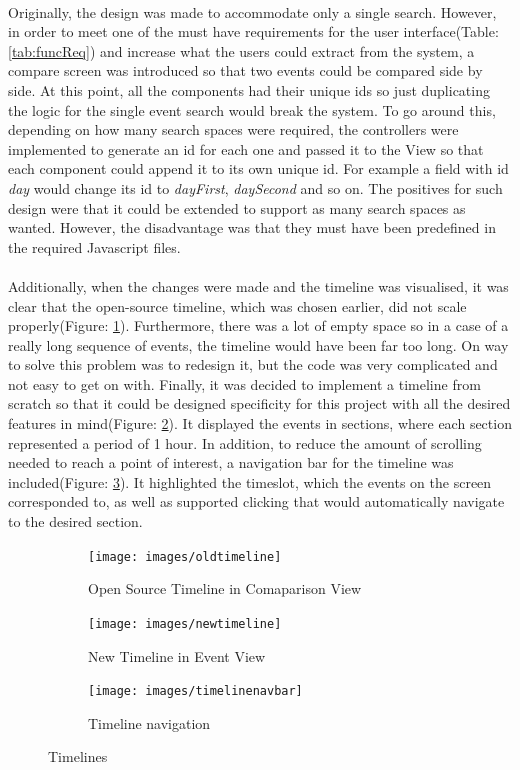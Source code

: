 \documentclass{l4proj}
\begin{document}
\paragraph{}
Originally, the design was made to accommodate only a single search. However, in order to meet one of the must have requirements for the user interface(Table: \ref{tab:funcReq}) and increase what the users could extract from the system, a compare screen was introduced so that two events could be compared side by side. At this point, all the components had their unique ids so just duplicating the logic for the single event search would break the system. To go around this, depending on how many search spaces were required, the controllers were implemented to generate an id for each one and passed it to the View so that each component could append it to its own unique id. For example a field with id \textit{day} would change its id to \textit{dayFirst}, \textit{daySecond} and so on. The positives for such design were that it could be extended to support as many search spaces as wanted. However, the disadvantage was that they must have been predefined in the required Javascript files.
\paragraph{}
Additionally, when the changes were made and the timeline was visualised, it was clear that the open-source timeline, which was chosen earlier, did not scale properly(Figure: \ref{oldtimeline}). Furthermore, there was a lot of empty space so in a case of a really long sequence of events, the timeline would have been far too long. On way to solve this problem was to redesign it, but the code was very complicated and not easy to get on with. Finally, it was decided to implement a timeline from scratch so that it could be designed specificity for this project with all the desired features in mind(Figure: \ref{newtimeline}). It displayed the events in sections, where each section represented a period of 1 hour. In addition, to reduce the amount of scrolling needed to reach a point of interest, a navigation bar for the timeline was included(Figure: \ref{timenavbar}). It highlighted the timeslot, which the events on the screen corresponded to, as well as supported clicking that would automatically navigate to the desired section. 

\begin{figure}[H]
	\centering
	\begin{subfigure}{.44\textwidth}
		\texttt{[image: images/oldtimeline]}
		\caption{Open Source Timeline in Comaparison View}
		\label{oldtimeline}
	\end{subfigure}
	\begin{subfigure}{.44\textwidth}
		\texttt{[image: images/newtimeline]}
		\caption{New Timeline in Event View}
		\label{newtimeline}
	\end{subfigure}
	\begin{subfigure}{.1\textwidth}
		\texttt{[image: images/timelinenavbar]}
		\caption{Timeline navigation}
		\label{timenavbar}
	\end{subfigure}
	\caption{Timelines}
	\label{fig:timelines}
\end{figure}
\end{document}
